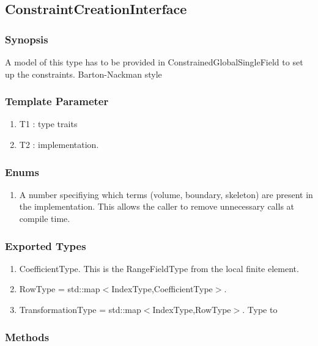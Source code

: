 \documentclass[11pt,a4paper,DIV11,%
notitlepage,oneside,abstracton,%
bibtotoc]{scrartcl}
\begin{document}
\subsection{ConstraintCreationInterface}

\subsubsection{Synopsis}

A model of this type has to be provided in
ConstrainedGlobalSingleField to set up the constraints.
Barton-Nackman style 

\subsubsection{Template Parameter}

\begin{enumerate}[1)]
\item T1 : type traits
\item T2 : implementation.
\end{enumerate}

\subsubsection{Enums}

\begin{enumerate}[1)]
\item A number specifiying which terms (volume, boundary, skeleton)
  are present in the implementation. This allows the caller to remove
  unnecessary calls at compile time.
\end{enumerate}

\subsubsection{Exported Types}

\begin{enumerate}[1)]
\item CoefficientType. This is the RangeFieldType from the local finite element.
\item RowType = std::map$<$IndexType,CoefficientType$>$.
\item TransformationType = std::map$<$IndexType,RowType$>$. Type to
\end{enumerate}

\subsubsection{Methods}
\end{document}
